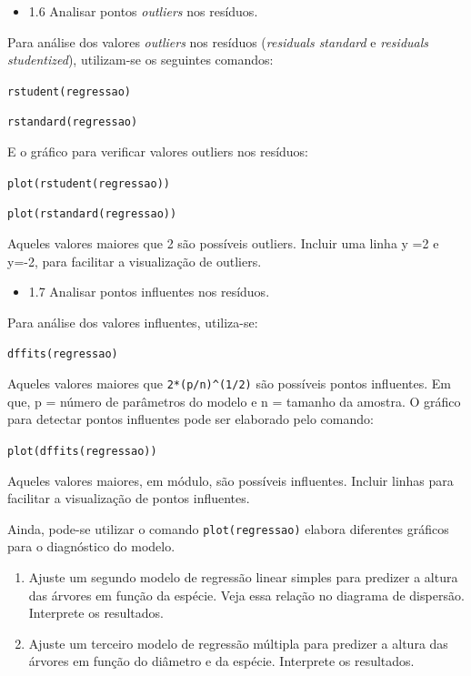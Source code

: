 \documentclass[12pt,brazil,]{book}
\providecommand{\tightlist}{%
  \setlength{\itemsep}{0pt}\setlength{\parskip}{0pt}}
\begin{document}
\begin{itemize}
\tightlist
\item
  1.6 Analisar pontos \emph{outliers} nos resíduos.
\end{itemize}

Para análise dos valores \emph{outliers} nos resíduos (\emph{residuals
standard} e \emph{residuals studentized}), utilizam-se os seguintes
comandos:

\texttt{rstudent(regressao)}

\texttt{rstandard(regressao)}

E o gráfico para verificar valores outliers nos resíduos:

\texttt{plot(rstudent(regressao))}

\texttt{plot(rstandard(regressao))}

Aqueles valores maiores que \textbar{}2\textbar{} são possíveis
outliers. Incluir uma linha y =2 e y=-2, para facilitar a visualização
de outliers.

\begin{itemize}
\tightlist
\item
  1.7 Analisar pontos influentes nos resíduos.
\end{itemize}

Para análise dos valores influentes, utiliza-se:

\texttt{dffits(regressao)}

Aqueles valores maiores que \texttt{2*(p/n)\^{}(1/2)} são possíveis
pontos influentes. Em que, p = número de parâmetros do modelo e n =
tamanho da amostra. O gráfico para detectar pontos influentes pode ser
elaborado pelo comando:

\texttt{plot(dffits(regressao))}

Aqueles valores maiores, em módulo, são possíveis influentes. Incluir
linhas para facilitar a visualização de pontos influentes.

Ainda, pode-se utilizar o comando \texttt{plot(regressao)} elabora
diferentes gráficos para o diagnóstico do modelo.

\begin{enumerate}
\def\labelenumi{\arabic{enumi})}
\setcounter{enumi}{1}
\item
  Ajuste um segundo modelo de regressão linear simples para predizer a
  altura das árvores em função da espécie. Veja essa relação no diagrama
  de dispersão. Interprete os resultados.
\item
  Ajuste um terceiro modelo de regressão múltipla para predizer a altura
  das árvores em função do diâmetro e da espécie. Interprete os
  resultados.
\end{enumerate}
\end{document}
